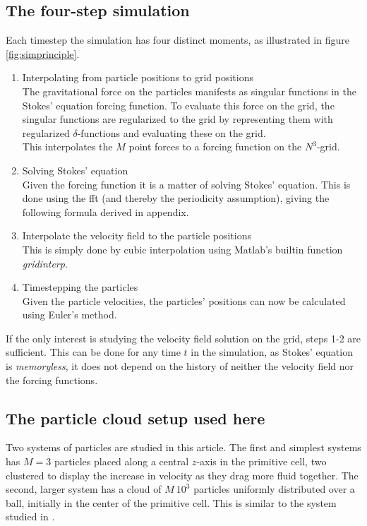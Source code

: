\documentclass[a4paper,
twoside=false,abstract=false,numbers=noenddot,
titlepage=false,headings=small,parskip=half,version=last]{scrartcl}
\begin{document}
\subsection{The four-step simulation}
Each timestep the simulation has four distinct moments, as illustrated in figure \ref{fig:simprinciple}.
\begin{enumerate}
\item{Interpolating from particle positions to grid positions}\\
The gravitational force on the particles manifests as singular functions in the Stokes' equation forcing function. To evaluate this force on the grid, the singular functions are regularized to the grid by representing them with regularized $\delta$-functions and evaluating these on the grid.\\ This interpolates the $M$ point forces to a forcing function on the $N^3$-grid.

\item{Solving Stokes' equation}\\
Given the forcing function it is a matter of solving Stokes' equation. This is done using the fft (and thereby the periodicity assumption), giving the following formula derived in appendix.

\item{Interpolate the velocity field to the particle positions}\\
This is simply done by cubic interpolation using Matlab's builtin function \emph{gridinterp}.

\item{Timestepping the particles}\\
Given the particle velocities, the particles' positions can now be calculated using Euler's method.
\end{enumerate}
If the only interest is studying the velocity field solution on the grid, steps 1-2 are sufficient. This can be done for any time $t$ in the simulation, as Stokes' equation is \emph{memoryless}, it does not depend on the history of neither the velocity field nor the forcing functions.

\subsection{The particle cloud setup used here}

Two systems of particles are studied in this article.
The first and simplest systems has $M=3$ particles placed along a central $z$-axis in the primitive cell, two clustered to display the increase in velocity as they drag more fluid together.
The second, larger system has a cloud of $M~10^3$ particles uniformly distributed over a ball, initially in the center of the primitive cell. This is similar to the system studied in \cite{fallingclouds}.
\end{document}
